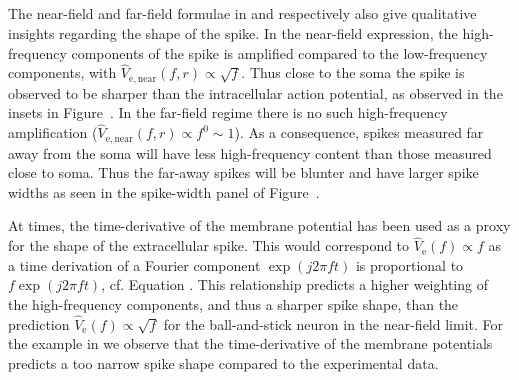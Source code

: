 \subsection{}
The near-field and far-field formulae in  and  respectively also give qualitative insights regarding the shape of the spike. In the near-field expression, the high-frequency components of the spike is amplified 
compared to the low-frequency components, with $\hat{V}_\mathrm{e,near}(f,r) \propto \sqrt{f}$.
Thus close to the soma the spike is observed to be sharper than the intracellular action potential,
as observed in the insets in Figure~.  
In the far-field regime there is no such high-frequency amplification ($\hat{V}_\mathrm{e,near}(f,r) \propto f^0 \sim 1$).
As a consequence, spikes measured far away from the soma will have less high-frequency content than those measured close to soma.
Thus the far-away spikes will be blunter and have larger spike widths as seen in the spike-width panel of 
Figure~.

At times, the time-derivative of the membrane potential has been used as a proxy for the shape of the extracellular spike.
This would correspond to  $\hat{V}_\mathrm{e}(f) \propto f$ as a time derivation of a Fourier component   
$\exp (j 2 \pi f t)$  is proportional to $f \exp (j 2 \pi f t)$, cf. Equation . This relationship predicts a higher weighting of
the high-frequency components, and thus a sharper spike shape, than the  prediction $\hat{V}_\mathrm{e}(f) \propto \sqrt{f}$ for the ball-and-stick neuron in the near-field limit.
For the example in  we observe that the time-derivative of the membrane potentials predicts a too narrow
spike shape compared to the experimental data.


